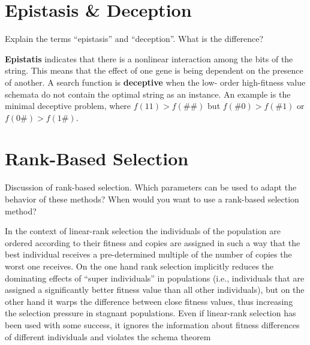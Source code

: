 \documentclass[../main.tex]{subfiles}
\begin{document}
\section{Epistasis \& Deception}
\begin{question}
Explain the terms ``epistasis'' and ``deception''. What is the difference?
\end{question}
\begin{solution}
\textbf{Epistatis} indicates that there is a nonlinear interaction among the bits of the string. This means that the
effect of one gene is being dependent on the presence of another. A search function is \textbf{deceptive} when the low-
order high-fitness value schemata do not contain the optimal string as an instance. An example is the minimal deceptive
problem, where $f(11) > f(\#\#)$ but $f(\#0) > f(\#1)$ or $f(0\#) > f(1\#)$.
\end{solution}

\section{Rank-Based Selection}
\begin{question}
Discussion of rank-based selection. Which parameters can be used to adapt the behavior of these methods? When would you
want to use a rank-based selection method?
\end{question}
\begin{solution}
In the context of linear-rank selection the individuals of the population are ordered according to their fitness and
copies are assigned in such a way that the best individual receives a pre-determined multiple of the number of copies
the worst one receives. On the one hand rank selection implicitly reduces the dominating effects of ``super
individuals'' in populations (i.e., individuals that are assigned a significantly better fitness value than all other
individuals), but on the other hand it warps the difference between close fitness values, thus increasing the selection
pressure in stagnant populations. Even if linear-rank selection has been used with some success, it ignores the
information about fitness differences of different individuals and violates the schema theorem
\end{solution}
\end{document}
